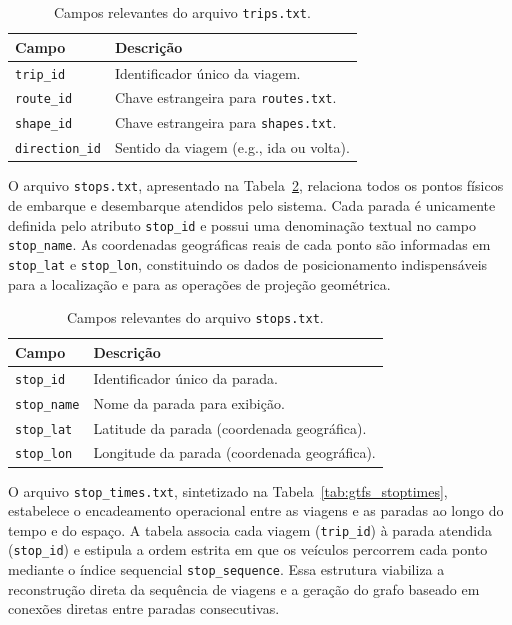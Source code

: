 \documentclass[cic,tc]{infufrgs}
\begin{document}
\begin{table}[H]
  \centering
  \caption{Campos relevantes do arquivo \texttt{trips.txt}.}
  \label{tab:gtfs_trips}
  \begin{tabular}{ll}
    \toprule
    \textbf{Campo} & \textbf{Descrição} \\
    \midrule
    \texttt{trip\_id} & Identificador único da viagem. \\
    \texttt{route\_id} & Chave estrangeira para \texttt{routes.txt}. \\
    \texttt{shape\_id} & Chave estrangeira para \texttt{shapes.txt}. \\
    \texttt{direction\_id} & Sentido da viagem (e.g., ida ou volta). \\
    \bottomrule
  \end{tabular}
\end{table}

O arquivo \texttt{stops.txt}, apresentado na Tabela~\ref{tab:gtfs_stops}, relaciona todos os pontos físicos de embarque e desembarque atendidos pelo sistema. Cada parada é unicamente definida pelo atributo \texttt{stop\_id} e possui uma denominação textual no campo \texttt{stop\_name}. As coordenadas geográficas reais de cada ponto são informadas em \texttt{stop\_lat} e \texttt{stop\_lon}, constituindo os dados de posicionamento indispensáveis para a localização e para as operações de projeção geométrica.

\begin{table}[H]
  \centering
  \caption{Campos relevantes do arquivo \texttt{stops.txt}.}
  \label{tab:gtfs_stops}
  \begin{tabular}{ll}
    \toprule
    \textbf{Campo} & \textbf{Descrição} \\
    \midrule
    \texttt{stop\_id} & Identificador único da parada. \\
    \texttt{stop\_name} & Nome da parada para exibição. \\
    \texttt{stop\_lat} & Latitude da parada (coordenada geográfica). \\
    \texttt{stop\_lon} & Longitude da parada (coordenada geográfica). \\
    \bottomrule
  \end{tabular}
\end{table}

O arquivo \texttt{stop\_times.txt}, sintetizado na Tabela~\ref{tab:gtfs_stoptimes}, estabelece o encadeamento operacional entre as viagens e as paradas ao longo do tempo e do espaço. A tabela associa cada viagem (\texttt{trip\_id}) à parada atendida (\texttt{stop\_id}) e estipula a ordem estrita em que os veículos percorrem cada ponto mediante o índice sequencial \texttt{stop\_sequence}. Essa estrutura viabiliza a reconstrução direta da sequência de viagens e a geração do grafo baseado em conexões diretas entre paradas consecutivas.
\end{document}

